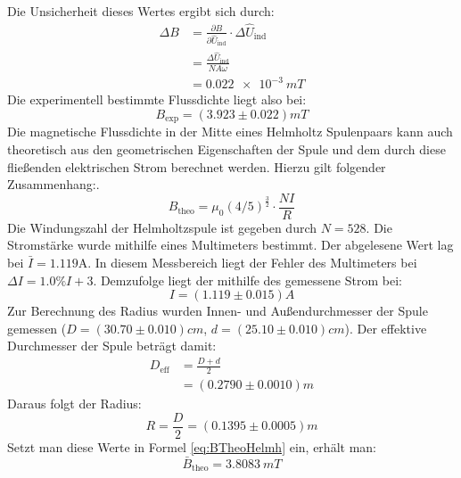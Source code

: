 \documentclass{report}
\begin{document}
Die Unsicherheit dieses Wertes ergibt sich durch:
\begin{equation}
    \begin{split}
        \Delta B &= \frac{\partial B}{\partial \hat{U}_{\mathrm{ind}}} \cdot \Delta \hat{U}_{\mathrm{ind}} \\
                    &= \frac{\Delta \hat{U}_{\mathrm{ind}}}{NA\omega} \\
                    &= \qty{0.022e-3}{mT}
    \end{split}
\end{equation}
Die experimentell bestimmte Flussdichte liegt also bei:
\begin{equation}
    \boxed{B_{\mathrm{exp}} = (3.923 \pm 0.022) \si{mT}}
\end{equation}
Die magnetische Flussdichte in der Mitte eines Helmholtz Spulenpaars kann auch theoretisch aus den geometrischen Eigenschaften der Spule und dem durch diese fließenden
elektrischen Strom berechnet werden. Hierzu gilt folgender Zusammenhang:.
\begin{equation}
    B_{\mathrm{theo}} = \mu_0 (4/5)^{\frac{3}{2}} \cdot \frac{NI}{R}
    \label{eq:BTheoHelmh}
\end{equation}
Die Windungszahl der Helmholtzspule ist gegeben durch $N = 528$.
Die Stromstärke wurde mithilfe eines Multimeters bestimmt. Der abgelesene Wert lag bei $\bar{I} = 1.119 \si{\ampere}$. In diesem Messbereich liegt der Fehler des Multimeters bei
$\Delta I = 1.0 \% I + 3$.
Demzufolge liegt der mithilfe des gemessene Strom bei:
\begin{equation}
    I = (1.119 \pm 0.015) A
\end{equation}
Zur Berechnung des Radius wurden Innen- und Außendurchmesser der Spule gemessen ($D = (30.70 \pm 0.010) \si{cm}$, $d = (25.10 \pm 0.010) \si{cm}$). 
Der effektive Durchmesser der Spule beträgt damit:
\begin{equation}
    \begin{split}
        D_{\mathrm{eff}}    &= \frac{D + d}{2} \\
                            &= (0.2790 \pm 0.0010) \si{m}
    \end{split}
\end{equation}
Daraus folgt der Radius:
\begin{equation}
    R = \frac{D}{2} = (0.1395 \pm 0.0005) \si{m}
\end{equation}
Setzt man diese Werte in Formel \ref{eq:BTheoHelmh} ein, erhält man:
\begin{equation}
    \bar{B}_{\mathrm{theo}} = \qty{3.8083}{mT}
\end{equation}
\end{document}
